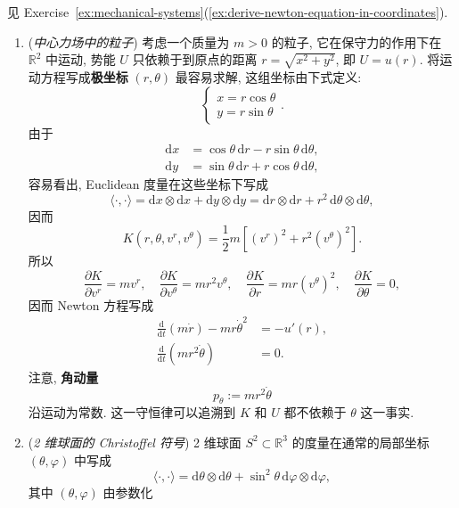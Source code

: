 \begin{RiemannProof}
见 Exercise~\ref{ex:mechanical-systems}(\ref{ex:derive-newton-equation-in-coordinates}).
\end{RiemannProof}

\begin{RiemannExample}\label{ex:central-fields-and-spherical-christoffel-symbols}
\begin{enumerate}[label=(\arabic*),ref=\arabic*,leftmargin=*]
\item\label{ex:particle-in-central-field} (\emph{中心力场中的粒子}) 考虑一个质量为 $m>0$ 的粒子, 它在保守力的作用下在 $\mathbb{R}^2$ 中运动, 势能 $U$ 只依赖于到原点的距离 $r=\sqrt{x^2+y^2}$, 即 $U=u(r)$. 将运动方程写成\textbf{极坐标} $(r,\theta)$ 最容易求解, 这组坐标由下式定义:
\[
  \begin{cases}
    x=r\cos\theta\\
    y=r\sin\theta
  \end{cases}.
\]
由于
\begin{align*}
  \mathrm{d}x&=\cos\theta\,\mathrm{d}r-r\sin\theta\,\mathrm{d}\theta,\\
  \mathrm{d}y&=\sin\theta\,\mathrm{d}r+r\cos\theta\,\mathrm{d}\theta,
\end{align*}
容易看出, Euclidean 度量在这些坐标下写成
\[
  \langle\cdot,\cdot\rangle=\mathrm{d}x\otimes\mathrm{d}x+\mathrm{d}y\otimes\mathrm{d}y
  =\mathrm{d}r\otimes\mathrm{d}r+r^2\,\mathrm{d}\theta\otimes\mathrm{d}\theta,
\]
因而
\[
  K(r,\theta,v^r,v^\theta)=\frac12m\left[(v^r)^2+r^2(v^\theta)^2\right].
\]
所以
\[
  \frac{\partial K}{\partial v^r}=mv^r,\quad
  \frac{\partial K}{\partial v^\theta}=mr^2v^\theta,\quad
  \frac{\partial K}{\partial r}=mr(v^\theta)^2,\quad
  \frac{\partial K}{\partial\theta}=0,
\]
因而 Newton 方程写成
\begin{align*}
  \frac{\mathrm{d}}{\mathrm{d}t}(m\dot r)-mr\dot\theta^2&=-u'(r),\\
  \frac{\mathrm{d}}{\mathrm{d}t}\left(mr^2\dot\theta\right)&=0.
\end{align*}
注意, \textbf{角动量}
\[
  p_\theta:=mr^2\dot\theta
\]
沿运动为常数. 这一守恒律可以追溯到 $K$ 和 $U$ 都不依赖于 $\theta$ 这一事实.
\item\label{ex:christoffel-symbols-of-two-sphere} (\emph{2 维球面的 Christoffel 符号}) 2 维球面 $S^2\subset\mathbb{R}^3$ 的度量在通常的局部坐标 $(\theta,\varphi)$ 中写成
\[
  \langle\cdot,\cdot\rangle=\mathrm{d}\theta\otimes\mathrm{d}\theta
    +\sin^2\theta\,\mathrm{d}\varphi\otimes\mathrm{d}\varphi,
\]
其中 $(\theta,\varphi)$ 由参数化
\[
\]
\end{enumerate}
\end{RiemannExample}
